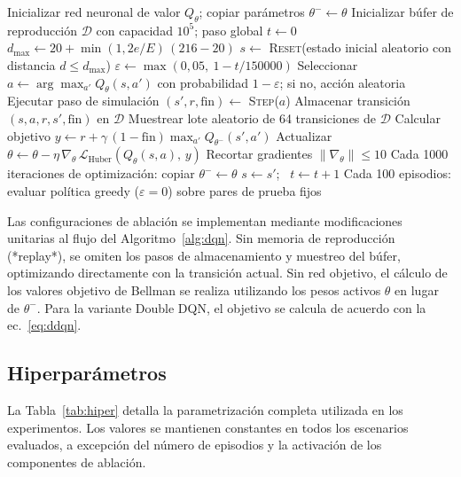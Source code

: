 \begin{algorithm}[t]
\caption{Entrenamiento DQN con aprendizaje curricular}
\label{alg:dqn}
\small
\begin{algorithmic}[1]
\State Inicializar red neuronal de valor $Q_\theta$; copiar parámetros $\theta^- \leftarrow \theta$
\State Inicializar búfer de reproducción $\mathcal{D}$ con capacidad $10^5$; paso global $t \leftarrow 0$
  \State $d_{\max} \leftarrow 20 + \min(1, 2e/E)\,(216-20)$ 
  \State $s \leftarrow$ \textsc{Reset}(estado inicial aleatorio con distancia $d \le d_{\max}$)
  \Repeat
    \State $\varepsilon \leftarrow \max(0{,}05,\ 1 - t/150000)$
    \State Seleccionar $a \leftarrow \arg\max_{a'} Q_\theta(s,a')$ con probabilidad $1-\varepsilon$; si no, acción aleatoria
    \State Ejecutar paso de simulación $(s', r, \text{fin}) \leftarrow$ \textsc{Step}($a$)
    \State Almacenar transición $(s,a,r,s',\text{fin})$ en $\mathcal{D}$
      \State Muestrear lote aleatorio de 64 transiciones de $\mathcal{D}$
      \State Calcular objetivo $y \leftarrow r + \gamma\,(1-\text{fin})\max_{a'} Q_{\theta^-}(s',a')$
      \State Actualizar $\theta \leftarrow \theta - \eta\,\nabla_\theta\, \mathcal{L}_{\text{Huber}}(Q_\theta(s,a),\,y)$
      \State Recortar gradientes $\lVert\nabla_\theta\rVert \le 10$
      \State Cada 1000 iteraciones de optimización: copiar $\theta^- \leftarrow \theta$
    \EndIf
    \State $s \leftarrow s'$; \ $t \leftarrow t+1$
  \State Cada 100 episodios: evaluar política greedy ($\varepsilon=0$) sobre pares de prueba fijos
\EndFor
\end{algorithmic}
\end{algorithm}

Las configuraciones de ablación se implementan mediante modificaciones unitarias al flujo del Algoritmo~\ref{alg:dqn}. Sin memoria de reproducción (*replay*), se omiten los pasos de almacenamiento y muestreo del búfer, optimizando directamente con la transición actual. Sin red objetivo, el cálculo de los valores objetivo de Bellman se realiza utilizando los pesos activos $\theta$ en lugar de $\theta^-$. Para la variante Double DQN, el objetivo se calcula de acuerdo con la ec.~\eqref{eq:ddqn}.

\subsection{Hiperparámetros}
La Tabla~\ref{tab:hiper} detalla la parametrización completa utilizada en los experimentos. Los valores se mantienen constantes en todos los escenarios evaluados, a excepción del número de episodios y la activación de los componentes de ablación.

